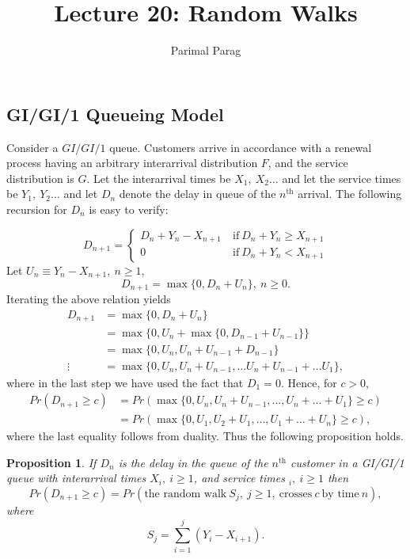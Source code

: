\documentclass[a4paper,10pt]{article}
\date{}
\title{Lecture 20: Random Walks}
\author{Parimal Parag}
\theoremstyle{plain}
\newtheorem{prop}[thm]{Proposition}
\theoremstyle{definition}
\theoremstyle{remark}
\begin{document}
\maketitle
\subsection{ GI/GI/1 Queueing Model}
Consider a $GI/GI/1$ queue. Customers arrive in accordance with a renewal process having an arbitrary interarrival distribution  $F$, and the service distribution is $G$. Let the interarrival times be $X_1,~X_2 \hdots $ and let the service times be $Y_1,~Y_2 \hdots$ and let $D_n$ denote the delay in queue of the $n^\text{th}$ arrival. The following recursion for  $D_n$ is easy to verify:

\begin{displaymath}
   D_{n+1} = \left\{
     \begin{array}{lr}
       D_n+Y_n-X_{n+1} & ~\text{if}~ D_n+Y_n \geq X_{n+1} \\
       0 & ~\text{if}~ D_n+Y_n <X_{n+1}
     \end{array}
   \right.
\end{displaymath}
Let $U_n \equiv Y_n-X_{n+1},~ n \geq 1$,
\begin{equation*}
D_{n+1}=\max\{0,D_n+U_n\},~ n \geq 0.
\end{equation*}
Iterating the above relation yields
\begin{eqnarray*}
D_{n+1}&=\max\{0,D_n+U_n\}\\
&=\max\{0,U_n+\max\{0,D_{n-1}+U_{n-1}\}\}\\
&=\max\{0,U_n,U_n+U_{n-1}+D_{n-1}\}\\
\vdots
&=\max\{0,U_n,U_n+U_{n-1}, \hdots U_n+U_{n-1}+\hdots U_1\},
\end{eqnarray*}
where in the last step we have used the fact that $D_1=0$. Hence, for $c>0$,
\begin{eqnarray*}
Pr(D_{n+1} \geq c )&=Pr(\max\{0,U_n,U_n+U_{n-1}, \hdots , U_n+ \hdots +U_1\} \geq c)\\
&=Pr(\max\{0,U_1,U_2+U_{1}, \hdots , U_1+ \hdots +U_n\} \geq c),
\end{eqnarray*}
where the last equality follows from duality. Thus the following proposition holds.
\begin{prop}
\label{prop_gigi1}
If $D_n$ is the delay in the queue of the $n^\text{th}$ customer in a GI/GI/1 queue with interarrival times $X_i,~ i \geq 1$, and service times $_i,~ i \geq 1$ then
\begin{equation}
\label{GIGI1_prop_eqn}
Pr(D_{n+1} \geq c) = Pr(\text{the random walk}~ S_j,~ j \geq 1,~\text{crosses}~ c~ \text{by time}~ n ),
\end{equation}
where 
\begin{equation*}
S_j=\sum_{i=1}^{j}(Y_i-X_{i+1}).
\end{equation*}
\end{prop}
\end{document}
